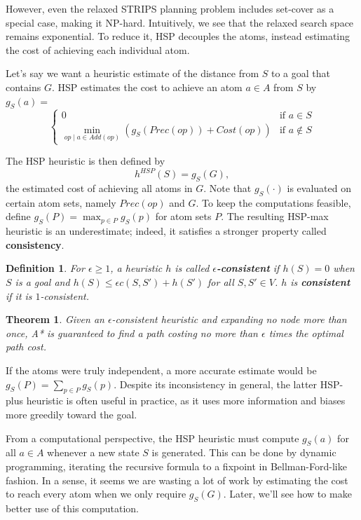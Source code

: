 \documentclass[letterpaper]{article}
\newtheorem{thm}{Theorem}
\newtheorem{defn}{Definition}
\begin{document}
However, even the relaxed STRIPS planning problem includes set-cover as a special case, making it NP-hard.
Intuitively, we see that the relaxed search space remains exponential.
To reduce it, HSP decouples the atoms, instead estimating the cost of achieving each individual atom.

Let's say we want a heuristic estimate of the distance from $S$ to a goal that contains $G$. HSP estimates the cost to achieve an atom $a\in A$ from $S$ by $g_S(a) = $
\[\begin{cases} 0  &\mbox{if } a \in S
\\ \min_{op\mid a\in Add(op)} \left(g_S(Prec(op)) + Cost(op)\right)  &\mbox{if } a \notin S \end{cases}\]

The HSP heuristic is then defined by
\[h^{HSP}(S) = g_S(G),\]
the estimated cost of achieving all atoms in $G$. Note that $g_S(\cdot)$ is evaluated on certain atom sets, namely $Prec(op)$ and $G$.
To keep the computations feasible, define $g_S(P) = \max_{p\in P} g_S(p)$ for atom sets $P$.
The resulting HSP-max heuristic is an underestimate; indeed, it satisfies a stronger property called \textbf{consistency}.

\begin{defn} For $\epsilon\ge 1$, a heuristic $h$ is called \textbf{$\epsilon$-consistent} if $h(S) = 0$ when $S$ is a goal and $h(S) \le \epsilon c(S,S') + h(S')$ for all $S,S'\in V$. $h$ is \textbf{consistent} if it is $1$-consistent. \end{defn}
\begin{thm} Given an $\epsilon$-consistent heuristic and expanding no node more than once, A* is guaranteed to find a path costing no more than $\epsilon$ times the optimal path cost.  \end{thm}

If the atoms were truly independent, a more accurate estimate would be $g_S(P) = \sum_{p\in P} g_S(p)$.
Despite its inconsistency in general, the latter HSP-plus heuristic is often useful in practice, as it uses more information and biases more greedily toward the goal.

From a computational perspective, the HSP heuristic must compute $g_S(a)$ for all $a\in A$ whenever a new state $S$ is generated.
This can be done by dynamic programming, iterating the recursive formula to a fixpoint in Bellman-Ford-like fashion.
In a sense, it seems we are wasting a lot of work by estimating the cost to reach every atom when we only require $g_S(G)$.
Later, we'll see how to make better use of this computation.
\end{document}
